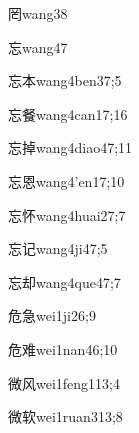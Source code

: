 \begin{verbete}{罔}{wang3}{8}
\end{verbete}

\begin{verbete}{忘}{wang4}{7}
\end{verbete}

\begin{verbete}{忘本}{wang4ben3}{7;5}
\end{verbete}

\begin{verbete}{忘餐}{wang4can1}{7;16}
\end{verbete}

\begin{verbete}{忘掉}{wang4diao4}{7;11}
\end{verbete}

\begin{verbete}{忘恩}{wang4'en1}{7;10}
\end{verbete}

\begin{verbete}{忘怀}{wang4huai2}{7;7}
\end{verbete}

\begin{verbete}{忘记}{wang4ji4}{7;5}
\end{verbete}

\begin{verbete}{忘却}{wang4que4}{7;7}
\end{verbete}

\begin{verbete}{危急}{wei1ji2}{6;9}
\end{verbete}

\begin{verbete}{危难}{wei1nan4}{6;10}
\end{verbete}

\begin{verbete}{微风}{wei1feng1}{13;4}
\end{verbete}

\begin{verbete}{微软}{wei1ruan3}{13;8}
\end{verbete}

